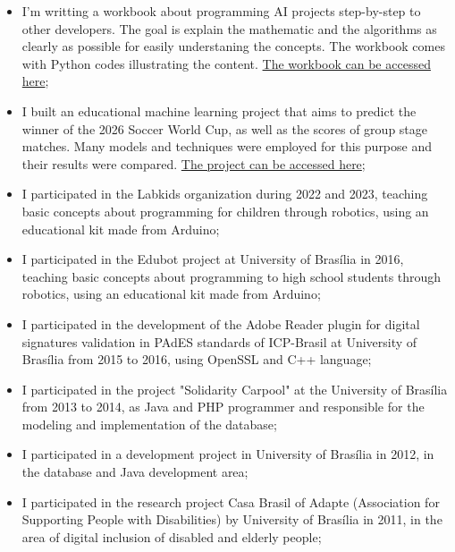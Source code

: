 \begin{itemize}
    \item I'm writting a workbook about programming AI projects step-by-step to other developers. The goal is explain the mathematic and the algorithms as clearly as possible for easily understaning the concepts. The workbook comes with Python codes illustrating the content. \href{https://github.com/rodrigorincon/ia}{The workbook can be accessed here};
    \item I built an educational machine learning project that aims to predict the winner of the 2026 Soccer World Cup, as well as the scores of group stage matches. Many models and techniques were employed for this purpose and their results were compared. \href{https://github.com/rodrigorincon/previsor-copa-do-mundo}{The project can be accessed here};
    \item I participated in the Labkids organization during 2022 and 2023, teaching basic concepts about programming for children through robotics, using an educational kit made from Arduino;
    \item I participated in the Edubot project at University of Brasília in 2016, teaching basic concepts about programming to high school students through robotics, using an educational kit made from Arduino;
    \item I participated in the development of the Adobe Reader plugin for digital signatures validation in PAdES standards of ICP-Brasil at University of Brasília from 2015 to 2016, using OpenSSL and C++ language;
    \item I participated in the project "Solidarity Carpool" at the University of Brasília from 2013 to 2014, as Java and PHP programmer and responsible for the modeling and implementation of the database;
    \item I participated in a development project in University of Brasília in 2012, in the database and Java development area;
    \item I participated in the research project Casa Brasil of Adapte (Association for Supporting People with Disabilities) by University of Brasília in 2011, in the area of digital inclusion of disabled and elderly people;
\end{itemize}
